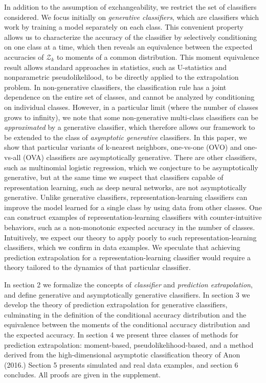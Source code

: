 \documentclass{article}
\begin{document}
In addition to the assumption of exchangeability, we restrict the set of classifiers considered.
We focus initially on \emph{generative classifiers}, which are classifiers which work by training
a model separately on each class.  This convenient property 
allows us to characterize the accuracy of the classifier by selectively conditioning on one class at a time,
which then reveals an equivalence between 
the expected accuracies of $\mathcal{Z}_k$ to moments of a common distribution.
This moment equivalence result allows standard approaches in statistics, such as U-statistics and
nonparametric pseudolikelilood, to be directly applied to the extrapolation problem.
In non-generative classifiers, the classification rule has a joint dependence on the entire set of classes,
and cannot be analyzed by conditioning on individual classes.
However, in a particular limit (where the number of classes grows to infinity), we note that
some non-generative multi-class classifiers can
be \emph{approximated} by a generative classifier, which therefore allows our framework
to be extended to the class of \emph{asymptotic generative} classifiers.
In this paper, we show that particular variants of k-nearest neighbors, one-vs-one (OVO) and one-vs-all (OVA) classifiers
are asymptotically generative.  There are other classifiers, such as multinomial logistic regression, which
we conjecture to be asymptotically generative, but at the same time we suspect that classifiers capable of representation learning, such as deep neural networks, are not asymptotically generative.  
Unlike generative classifiers, representation-learning classifiers can improve the model learned for a single class by using data from other classes.  One can construct examples of representation-learning classifiers with counter-intuitive behaviors, such 
as a non-monotonic expected accuracy in the number of classes.  Intuitively,
we expect our theory to apply poorly to such representation-learning classifiers,
which we confirm in data examples.  We speculate that achieving prediction extrapolation
for a representation-learning classifier would require a theory tailored to the dynamics of that particular classifier.

In section 2 we formalize the concepts of \emph{classifier} and \emph{prediction extrapolation},
and define generative and asymptotically generative classifiers.  In section 3 we develop the theory of prediction
extrapolation for generative classifiers, culminating in the definition of the conditional accuracy distribution
and the equivalence between the moments of the conditional accuracy distribution and the expected accuracy.
In section 4 we present three classes of methods for prediction extrapolation:
moment-based, pseudolikelihood-based, and a method derived from the high-dimensional asymptotic 
classification theory of Anon (2016.)  Section 5 presents simulated and real data examples, and section 6 concludes.
All proofs are given in the supplement.
\end{document}
